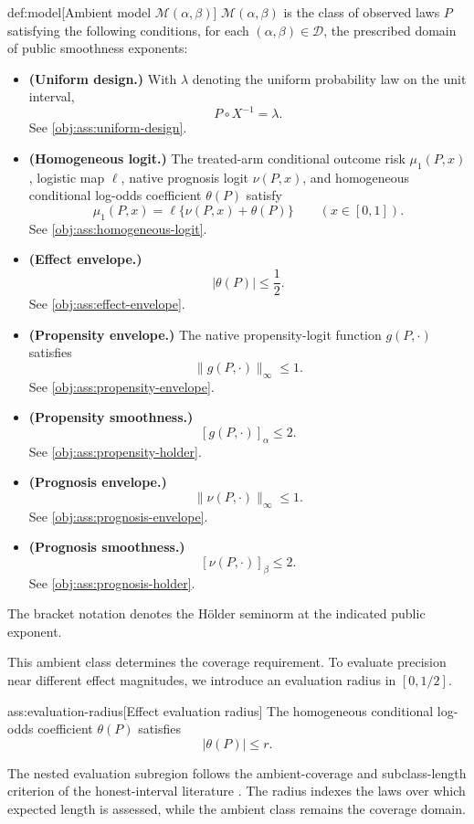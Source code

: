 \documentclass[11pt]{article}
\begin{document}
\begin{definitionv}{def:model}[Ambient model \(\mathcal M(\alpha,\beta)\)]
\(\mathcal M(\alpha,\beta)\) is the class of observed laws \(P\) satisfying the following conditions, for each \((\alpha,\beta)\in\mathcal D\), the prescribed domain of public smoothness exponents:
\begin{itemize}
\item \textbf{(Uniform design.)} With \(\lambda\) denoting the uniform probability law on the unit interval,
\[
P\circ X^{-1}=\lambda.
\]
See \cref{obj:ass:uniform-design}.
\item \textbf{(Homogeneous logit.)} The treated-arm conditional outcome risk \(\mu_1(P,x)\), logistic map \(\ell\), native prognosis logit \(\nu(P,x)\), and homogeneous conditional log-odds coefficient \(\theta(P)\) satisfy
\[
\mu_1(P,x)=\ell\{\nu(P,x)+\theta(P)\}
\qquad (x\in[0,1]).
\]
See \cref{obj:ass:homogeneous-logit}.
\item \textbf{(Effect envelope.)}
\[
|\theta(P)|\le \frac12.
\]
See \cref{obj:ass:effect-envelope}.
\item \textbf{(Propensity envelope.)} The native propensity-logit function \(g(P,\cdot)\) satisfies
\[
\|g(P,\cdot)\|_\infty\le 1.
\]
See \cref{obj:ass:propensity-envelope}.
\item \textbf{(Propensity smoothness.)}
\[
[g(P,\cdot)]_\alpha\le 2.
\]
See \cref{obj:ass:propensity-holder}.
\item \textbf{(Prognosis envelope.)}
\[
\|\nu(P,\cdot)\|_\infty\le 1.
\]
See \cref{obj:ass:prognosis-envelope}.
\item \textbf{(Prognosis smoothness.)}
\[
[\nu(P,\cdot)]_\beta\le 2.
\]
See \cref{obj:ass:prognosis-holder}.
\end{itemize}
The bracket notation denotes the Hölder seminorm at the indicated public exponent.
\end{definitionv}

This ambient class determines the coverage requirement. To evaluate precision near different effect magnitudes, we introduce an evaluation radius  in \([0,1/2]\).

\begin{assumptionv}{ass:evaluation-radius}[Effect evaluation radius]
The homogeneous conditional log-odds coefficient \(\theta(P)\) satisfies
\[
|\theta(P)|\le r.
\]
\end{assumptionv}

The nested evaluation subregion follows the ambient-coverage and subclass-length criterion of the honest-interval literature \citep{CaiLow2004ConfidenceAdaptation}. The radius indexes the laws over which expected length is assessed, while the ambient class remains the coverage domain.
\end{document}
